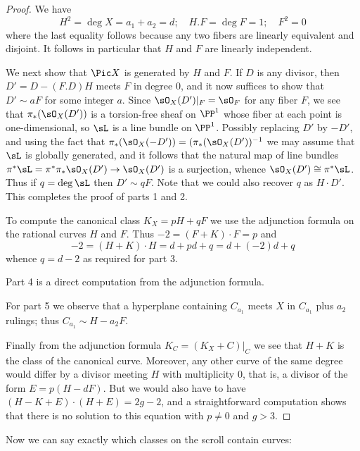 \begin{proof}
We have 
$$
H^2 = \deg X = a_1+a_2 = d; \quad H.F = \deg F = 1; \quad F^2 = 0
$$
where the last equality follows because any two fibers are linearly equivalent and disjoint.
It follows in particular that $H$ and $F$ are linearly independent.

We next show that $\Pic X$ is generated by $H$ and $F$. If $D$ is any divisor,
then $D' = D - (F.D)H$ meets $F$ in degree 0, and it now suffices to show that $D'\sim aF$ for
some integer $a$.
Since $\sO_X(D')|_F = \sO_F$ for any fiber $F$, we see that
$\pi_*(\sO_X(D'))$ is a torsion-free sheaf on $\PP^1$ whose fiber at each point is one-dimensional, 
so $\sL$ is a line bundle on $\PP^1$.  Possibly replacing $D'$ by $-D'$, and using the fact that
$\pi_*(\sO_X(-D')) = (\pi_*(\sO_X(D'))^{-1}$ we may assume that $\sL$ is globally generated, and it follows that  the natural map of line bundles $\pi^*\sL = \pi^*\pi_* \sO_X(D') \to \sO_X(D') $ is a surjection, whence 
$\sO_X(D') \cong \pi^*\sL$. Thus if $q = \deg \sL$ then
$D' \sim qF$. Note that we could also recover $q$ as $H\cdot D'$. This completes the proof of parts
1 and 2.

To compute the canonical class $K_X = pH+qF$ we use the adjunction formula on the rational curves
$H$ and $F$. Thus $-2 = (F+K)\cdot F = p $ and 
$$
-2 = (H+K)\cdot H = d + pd+q = d + (-2)d+q
$$
whence $q = d-2$ as required for part 3.
 
 Part 4 is a direct computation from the adjunction formula.
 
For part 5 we observe that a hyperplane containing $C_{a_1}$ meets $X$ in $C_{a_1}$ plus
$a_2$ rulings; thus $C_{a_1}\sim H-a_2F$.

Finally from the adjunction formula $K_C = (K_X+C)|_C$ we see that $H+K$ is the class of
the canonical curve. Moreover, any other curve of the same degree would differ by
a divisor meeting $H$ with multiplicity 0, that is, a divisor of the form $E = p(H-dF)$.
But we would also have to have $(H-K+E)\cdot(H+E) = 2g-2$, and a straightforward
computation shows that there is no solution to this equation with $p\neq 0$ and $g>3$.
\end{proof}

Now we can say exactly which classes on the scroll contain curves:

